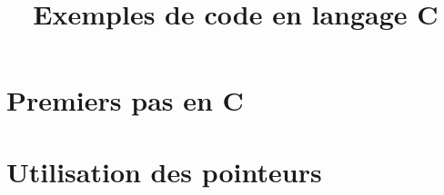 \documentclass[a4paper]{article}
\title{Exemples de code en langage C}
\begin{document}
\maketitle

\section{Premiers pas en C}
 \clearpage
 \clearpage
 \clearpage
 \clearpage
 \clearpage
 \clearpage
 \clearpage
 \clearpage

\section{Utilisation des pointeurs}
 \clearpage
 \clearpage
 \clearpage
 \clearpage
\end{document}
